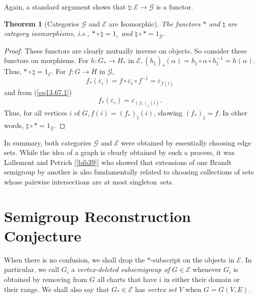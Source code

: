 \documentclass{surv-l}
\numberwithin{equation}{section}
\numberwithin{table}{section}
\numberwithin{figure}{section}
\theoremstyle{plain}
\newtheorem{theorem}[equation]{Theorem}
\theoremstyle{definition}
\begin{document}
Again, a standard argument shows that $\natural :
\mathcal{E}\rightarrow \mathcal{G}$ is a functor.

\begin{theorem}[Categories $\mathcal{G}$ and $\mathcal{E}$ are
Isomorphic]\label{thm13.67.4} The functors
$*$ and $\natural$ are category isomorphisms, i.e.,
$*\circ \natural=1_{\varepsilon}$ and
$\natural\circ*=1_{\mathcal{G}}$.
\end{theorem}

\begin{proof}These functors are clearly mutually inverse on
objects. So consider these functors on morphisms. For $h :
G_{\ast}\rightarrow H_{\ast}$ in $\mathcal{E},
(h_{\natural})_{\ast}(\alpha)=h_{\natural}\circ \alpha
\circ h_{\natural}^{-1}= h(\alpha)$. Thus, $*\circ
\natural =1_{\mathcal{E}}$. For $f:G\rightarrow H$
in $\mathcal{G}$,
\[
f_{\ast}(\varepsilon_{i})=f\circ\varepsilon_{i}\circ f^{-1}=\varepsilon_{f(i)}
\]
and from (\ref{eq13.67.1})
\[
f_{\ast}(\varepsilon_{i})=\varepsilon_{(f_{\ast})_{\natural}(i)}.
\]
Thus, for all vertices $i$ of $G,
f(i)=(f_{\ast})_{\natural}(i)$, showing
$(f_{\ast})_{\natural}=f$. In other words, $\natural
\circ *=1_{\mathcal{G}}.$
\end{proof}

In summary, both categories $\mathcal{G}$ and $\mathcal{E}$ were
obtained by essentially choosing edge sets. While the idea of a
graph is clearly obtained by such a process, it was
Lallement and Petrich
[\ref{bib39}] who showed that extensions of one
Brandt semigroup by another is also fundamentally related to
choosing collections of sets whose pairwise intersections are at
most singleton~sets.

\section{Semigroup Reconstruction Conjecture}\label{sec13.68}

When there is no confusion, we shall drop the $*$-subscript on the
objects in $\mathcal{E}$. In particular, we call $G_{i}$ a
\emph{vertex-deleted subsemigroup of} $G\in \mathcal{E}$ whenever $G_{i}$ is obtained
by removing from $G$ all charts that have $i$ in either their
domain or their range. We shall also say that $G_{\ast}\in
\mathcal{E}$ has \emph{vertex set} $V$
when $G=G(V, E)$.\\
\end{document}
